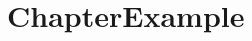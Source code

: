\documentclass[12pt,oneside]{book}
\begin{document}
	
	
	\tableofcontents
	\clearpage

\chapter{ChapterExample}
	
\end{document}
